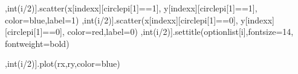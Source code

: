 \documentclass[letterpaper,10pt,english]{sphinxmanual}
\begin{document}
{\begin{sphinxVerbatim}[commandchars=\\\{\}]
       
           \PYG{p}{[}\PYG{p}{]} 
          
            

            \PYG{p}{[}\PYG{p}{]} \PYG{p}{[}\PYG{p}{]}
            \PYG{p}{[},int(i/2)].scatter(x[index\PYGZus{}x][circle\PYGZus{}pi[\PYGZhy{}1]==1], y[index\PYGZus{}x][circle\PYGZus{}pi[\PYGZhy{}1]==1], color=\PYGZdq{}blue\PYGZdq{},label=\PYGZdq{}1\PYGZdq{})
            \PYG{p}{[},int(i/2)].scatter(x[index\PYGZus{}x][circle\PYGZus{}pi[\PYGZhy{}1]==0], y[index\PYGZus{}x][circle\PYGZus{}pi[\PYGZhy{}1]==0], color=\PYGZdq{}red\PYGZdq{},label=\PYGZdq{}0\PYGZdq{})
            \PYG{p}{[},int(i/2)].set\PYGZus{}title(option\PYGZus{}list[i],fontsize=14, fontweight=\PYGZdq{}bold\PYGZdq{})

            
          
          
        \PYG{p}{[},int(i/2)].plot(r\PYGZus{}x,r\PYGZus{}y,color=\PYGZdq{}blue\PYGZdq{})


\end{sphinxVerbatim}}
\end{document}

